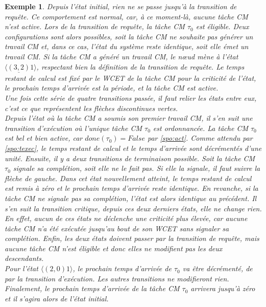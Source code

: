 \documentclass[12pt,a4paper,oneside]{book}
\theoremstyle{break}
\newtheorem{exem}{Exemple}[chapter]
\theoremstyle{breakplain}
\begin{document}
\begin{exem}
\pagebreak

Depuis l'état initial, rien ne se passe jusqu'à la transition de requête. Ce comportement est normal, car, à ce moment-là, aucune tâche CM n'est active. Lors de la transition de requête, la tâche CM $\tau_0$ est éligible. Deux configurations sont alors possibles, soit la tâche CM ne souhaite pas générer un travail CM et, dans ce cas, l'état du système reste identique, soit elle émet un travail CM. Si la tâche CM a généré un travail CM, le nœud mène à l'état $\langle \underline{(3, 2)} 1\rangle$, respectant bien la définition de la transition de requête. Le temps restant de calcul est fixé par le WCET de la tâche CM pour la criticité de l'état, le prochain temps d'arrivée est la période, et la tâche CM est active.\\

Une fois cette série de quatre transitions passée, il faut relier les états entre eux, c'est ce que représentent les flèches discontinues vertes.\\

Depuis l'état où la tâche CM a soumis son premier travail CM, il s'en suit une transition d'exécution où l'unique tâche CM $\tau_0$ est ordonnancée. La tâche CM $\tau_0$ est bel et bien active, car $done(\tau_0) = False$ par \autoref{spo:act}. Comme attendu par \autoref{spo:texec}, le temps restant de calcul et le temps d'arrivée sont décrémentés d'une unité. Ensuite, il y a deux transitions de terminaison possible. Soit la tâche CM $\tau_0$ signale sa complétion, soit elle ne le fait pas. Si elle la signale, il faut suivre la flèche de gauche. Dans cet état nouvellement atteint, le temps restant de calcul est remis à zéro et le prochain temps d'arrivée reste identique. En revanche, si la tâche CM ne signale pas sa complétion, l'état est alors identique au précédent. Il s'en suit la transition critique, depuis ces deux derniers états, elle ne change rien. En effet, aucun de ces états ne déclenche une criticité plus élevée, car aucune tâche CM n'a été exécutée jusqu'au bout de son WCET sans signaler sa complétion. Enfin, les deux états doivent passer par la transition de requête, mais aucune tâche CM n'est éligible et donc elles ne modifient pas les deux descendants.\\

Pour l'état $\langle (2, 0) 1 \rangle$, le prochain temps d'arrivée de $\tau_0$ va être décrémenté, de par la transition d'exécution. Les autres transitions ne modifieront rien. Finalement, le prochain temps d'arrivée de la tâche CM $\tau_0$ arrivera jusqu'à zéro et il s'agira alors de l'état initial.\\


\end{exem}
\end{document}

